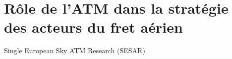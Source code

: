 \section{Rôle de l'ATM dans la stratégie des acteurs du fret aérien}

Single European Sky ATM Research
(SESAR)


